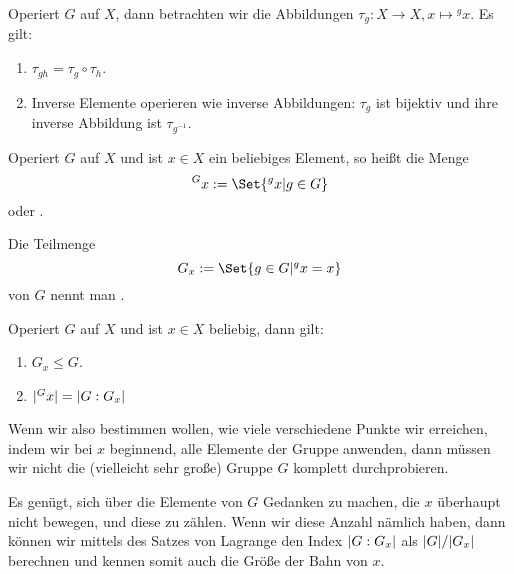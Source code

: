 \begin{lemma}[Offensichtliches]
Operiert $G$ auf $X$, dann betrachten wir die Abbildungen $\tau_g: X\to X, x\mapsto {^g x}$. Es gilt:
\begin{enumerate}
\item $\tau_{gh} =\tau_g\circ\tau_h$.
\item Inverse Elemente operieren wie inverse Abbildungen: $\tau_g$ ist bijektiv und ihre inverse Abbildung ist $\tau_{g^{-1}}$.
\end{enumerate}
\end{lemma}

\begin{definition}
Operiert $G$ auf $X$ und ist $x\in X$ ein beliebiges Element, so heißt die Menge
\[{^G x} := \Set{{^g x} | g\in G}\]
 oder .

Die Teilmenge
\[G_x := \Set{g\in G | {^g x} = x}\]
von $G$ nennt man .
\end{definition}

\begin{theorem}
Operiert $G$ auf $X$ und ist $x\in X$ beliebig, dann gilt:
\begin{enumerate}
\item $G_x\leq G$.
\item $\lvert^G x\rvert = \lvert G:G_x\rvert$
\end{enumerate}
\end{theorem}
\begin{remark}
Wenn wir also bestimmen wollen, wie viele verschiedene Punkte wir erreichen, indem wir bei $x$ beginnend, alle Elemente der Gruppe anwenden, dann müssen wir nicht die (vielleicht sehr große) Gruppe $G$ komplett durchprobieren.

Es genügt, sich über die Elemente von $G$ Gedanken zu machen, die $x$ überhaupt nicht bewegen, und diese zu zählen. Wenn wir diese Anzahl nämlich haben, dann können wir mittels des Satzes von Lagrange den Index $\lvert G:G_x\rvert$ als $\lvert G\rvert / \lvert G_x\rvert$ berechnen und kennen somit auch die Größe der Bahn von $x$.
\end{remark}

